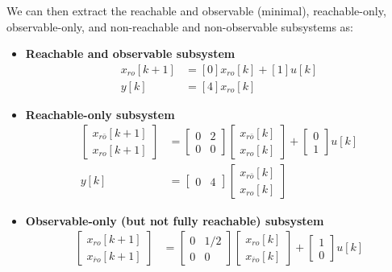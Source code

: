 \documentclass[twoside, 11pt, a4paper]{article}
\begin{document}
We can then extract the reachable and observable (minimal), reachable-only, observable-only, and non-reachable and non-observable subsystems as:
\begin{itemize}
    \item \textbf{Reachable and observable subsystem}
    \begin{align*}
        x_{ro}[k+1] &= [0] x_{ro}[k] + [1] u[k]
        \\
        y[k] &= [4] x_{ro}[k]
    \end{align*}
    \item \textbf{Reachable-only subsystem}
    \begin{align*}
        \begin{bmatrix} x_{r\bar{o}}[k+1] \\ x_{ro}[k+1] \end{bmatrix} &= 
        \left[ \begin{array}{c|c} 0 & 2 \\ \hline 
    0 & 0  \end{array} \right]
    \begin{bmatrix} x_{r\bar{o}}[k] \\ x_{ro}[k] \end{bmatrix} + \left[ \begin{array}{c} 0 \\ 1 \end{array} \right] u[k]
        \\
        y[k] &= \left[ \begin{array}{c|c} 0 & 4 \end{array} \right] \begin{bmatrix} x_{r\bar{o}}[k] \\ x_{ro}[k] \end{bmatrix}  
    \end{align*}
    \item \textbf{Observable-only (but not fully reachable) subsystem}
    \begin{align*}
        \begin{bmatrix} x_{ro}[k+1] \\ x_{\bar{r}o}[k+1] \end{bmatrix} &= 
        \left[ \begin{array}{c|c} 0 & 1/2 \\ \hline 
    0 & 0  \end{array} \right]
    \begin{bmatrix} x_{ro}[k] \\ x_{\bar{r}o}[k] \end{bmatrix} + \left[ \begin{array}{c} 1 \\ 0 \end{array} \right] u[k]

\end{align*}
\end{itemize}
\end{document}
